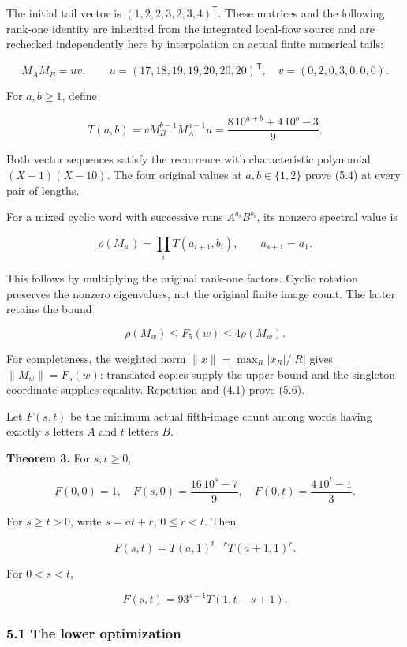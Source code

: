 \documentclass[11pt,a4paper]{article}
\begin{document}
The initial tail vector is \((1,2,2,3,2,3,4)^{\mathsf T}\). These matrices and the following rank-one identity are inherited from the integrated local-flow source and are rechecked independently here by interpolation on actual finite numerical tails:

\[
M_AM_B=uv,\qquad
u=(17,18,19,19,20,20,20)^{\mathsf T},\quad
v=(0,2,0,3,0,0,0).
\tag{5.3}
\]

For \(a,b\ge1\), define

\[
T(a,b)=vM_B^{b-1}M_A^{a-1}u
=\frac{8\,10^{a+b}+4\,10^b-3}{9}.
\tag{5.4}
\]

Both vector sequences satisfy the recurrence with characteristic polynomial \((X-1)(X-10)\). The four original values at \(a,b\in\{1,2\}\) prove (5.4) at every pair of lengths.

For a mixed cyclic word with successive runs \(A^{a_i}B^{b_i}\), its nonzero spectral value is

\[
\rho(M_w)=\prod_i T(a_{i+1},b_i),\qquad a_{s+1}=a_1.
\tag{5.5}
\]

This follows by multiplying the original rank-one factors. Cyclic rotation preserves the nonzero eigenvalues, not the original finite image count. The latter retains the bound

\[
\rho(M_w)\le F_5(w)\le4\rho(M_w).
\tag{5.6}
\]

For completeness, the weighted norm \(\|x\|=\max_R|x_R|/|R|\) gives \(\|M_w\|=F_5(w)\): translated copies supply the upper bound and the singleton coordinate supplies equality. Repetition and (4.1) prove (5.6).

Let \(F(s,t)\) be the minimum actual fifth-image count among words having exactly \(s\) letters \(A\) and \(t\) letters \(B\).

\textbf{Theorem 3.} For \(s,t\ge0\),

\[
F(0,0)=1,\quad
F(s,0)=\frac{16\,10^s-7}{9},\quad
F(0,t)=\frac{4\,10^t-1}{3}.
\tag{5.7}
\]

For \(s\ge t>0\), write \(s=at+r\), \(0\le r<t\). Then

\[
\boxed{F(s,t)=T(a,1)^{t-r}T(a+1,1)^r.}
\tag{5.8}
\]

For \(0<s<t\),

\[
\boxed{F(s,t)=93^{s-1}T(1,t-s+1).}
\tag{5.9}
\]

\subsubsection{5.1 The lower optimization}\label{eporig:the-lower-optimization}
\end{document}
